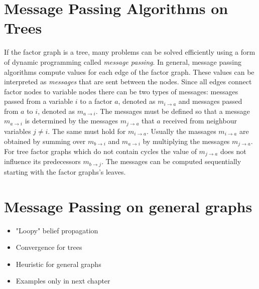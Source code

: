 \section{Message Passing Algorithms on Trees}

If the factor graph is a tree, many problems can be solved efficiently using a form of dynamic programming called \emph{message passing}. \newline 
In general, message passing algorithms compute values for each edge of the factor graph. These values can be interpreted as \emph{messages} that are sent between the nodes. Since all edges connect factor nodes to variable nodes there can be two types of messages: messages passed from a variable $i$ to a factor $a$, denoted as $m_{i \rightarrow a}$ and messages passed from $a$ to $i$, denoted as $m_{a \rightarrow i}$. \newline
The messages must be defined so that a message $m_{a \rightarrow i}$ is determined by the messages $m_{j \rightarrow a}$ that $a$ received from neighbour variables $j \neq i$. 
The same must hold for $m_{i \rightarrow a}$. \newline
Usually the massages $m_{i \rightarrow a}$ are obtained by summing over $m_{b \rightarrow i}$ and $m_{a \rightarrow i}$ by multiplying the messages $m_{j \rightarrow a}$. \newline
For tree factor graphs which do not contain cycles the value of $m_{j \rightarrow a}$ does not influence its predecessors $m_{b \rightarrow j}$. The messages can be computed sequentially starting with the factor graphs's leaves.




\section{Message Passing on general graphs}

\begin{itemize}
	\item "Loopy" belief propagation
	\item Convergence for trees
	\item Heuristic for general graphs
	\item Examples only in next chapter
		  
\end{itemize}